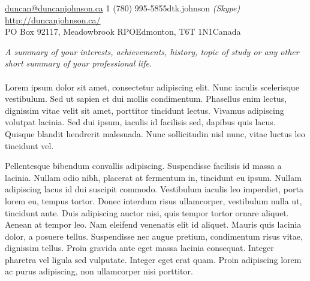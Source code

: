 \documentclass[10pt,letterpaper]{article} %
\begin{document}
 



\noindent\href{mailto:duncan@duncanjohnson.ca}{duncan@duncanjohnson.ca}\bull %
\textsmaller{+}1 (780) 995-5855\bull dtk.johnson \textit{(Skype)}\bull %
\href{http://duncanjohnson.ca/}{http://duncanjohnson.ca/}\\ %
PO Box 92117, Meadowbrook RPO\bull Edmonton, \bull T6T 1N1\bull Canada %

\spacedhrule{0.9em}{-0.4em} %



\vspace{-1.3em} %

\begin{multicols}{2}  %
\noindent \textit{A summary of your interests, achievements, history, topic of study or any other short summary of your professional life.}\\\\
Lorem ipsum dolor sit amet, consectetur adipiscing elit. Nunc iaculis scelerisque vestibulum. Sed ut sapien et dui mollis condimentum. Phasellus enim lectus, dignissim vitae velit sit amet, porttitor tincidunt lectus. Vivamus adipiscing volutpat lacinia. Sed dui ipsum, iaculis id facilisis sed, dapibus quis lacus. Quisque blandit hendrerit malesuada. Nunc sollicitudin nisl nunc, vitae luctus leo tincidunt vel.

Pellentesque bibendum convallis adipiscing. Suspendisse facilisis id massa a lacinia. Nullam odio nibh, placerat at fermentum in, tincidunt eu ipsum. Nullam adipiscing lacus id dui suscipit commodo. Vestibulum iaculis leo imperdiet, porta lorem eu, tempus tortor. Donec interdum risus ullamcorper, vestibulum nulla ut, tincidunt ante. Duis adipiscing auctor nisi, quis tempor tortor ornare aliquet. Aenean at tempor leo. Nam eleifend venenatis elit id aliquet. Mauris quis lacinia dolor, a posuere tellus. Suspendisse nec augue pretium, condimentum risus vitae, dignissim tellus. Proin gravida ante eget massa lacinia consequat. Integer pharetra vel ligula sed vulputate. Integer eget erat quam. Proin adipiscing lorem ac purus adipiscing, non ullamcorper nisi porttitor. 
\end{multicols}
\end{document}
